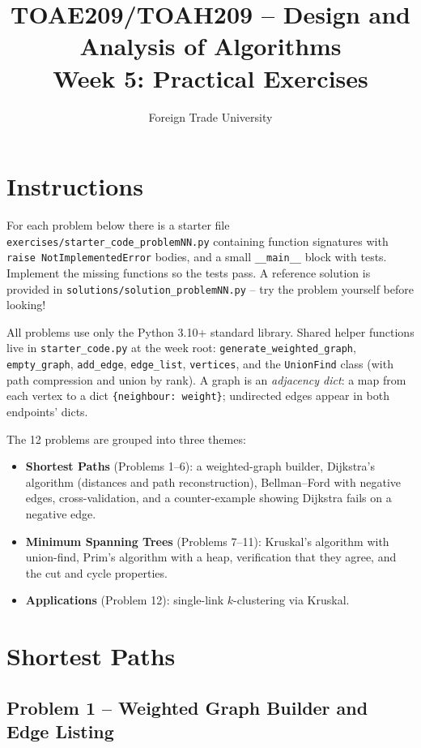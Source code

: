 \documentclass[11pt]{article}
\title{TOAE209/TOAH209 -- Design and Analysis of Algorithms\\[4pt]
\large Week 5: Practical Exercises}
\author{Foreign Trade University}
\date{}
\begin{document}
\maketitle

\section*{Instructions}

For each problem below there is a starter file
\texttt{exercises/starter\_code\_problemNN.py} containing function signatures with
\texttt{raise NotImplementedError} bodies, and a small \texttt{\_\_main\_\_} block with
tests. Implement the missing functions so the tests pass. A reference solution is
provided in \texttt{solutions/solution\_problemNN.py} -- try the problem yourself before
looking!

All problems use only the Python 3.10+ standard library. Shared helper functions live in
\texttt{starter\_code.py} at the week root: \texttt{generate\_weighted\_graph},
\texttt{empty\_graph}, \texttt{add\_edge}, \texttt{edge\_list}, \texttt{vertices}, and the
\texttt{UnionFind} class (with path compression and union by rank). A graph is an
\emph{adjacency dict}: a map from each vertex to a dict \texttt{\{neighbour: weight\}};
undirected edges appear in both endpoints' dicts.

The 12 problems are grouped into three themes:
\begin{itemize}
    \item \textbf{Shortest Paths} (Problems 1--6): a weighted-graph builder, Dijkstra's
    algorithm (distances and path reconstruction), Bellman--Ford with negative edges,
    cross-validation, and a counter-example showing Dijkstra fails on a negative edge.
    \item \textbf{Minimum Spanning Trees} (Problems 7--11): Kruskal's algorithm with
    union-find, Prim's algorithm with a heap, verification that they agree, and the cut
    and cycle properties.
    \item \textbf{Applications} (Problem 12): single-link $k$-clustering via Kruskal.
\end{itemize}

\newpage
\section{Shortest Paths}

\subsection*{Problem 1 -- Weighted Graph Builder and Edge Listing}
\end{document}
